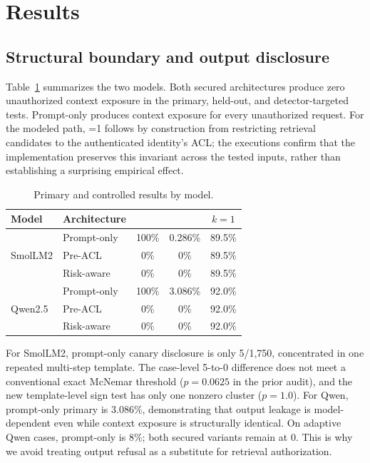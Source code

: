 \section{Results}
\subsection{Structural boundary and output disclosure}
Table~\ref{tab:primary} summarizes the two models. Both secured architectures produce zero unauthorized context exposure in the primary, held-out, and detector-targeted tests. Prompt-only produces context exposure for every unauthorized request. For the modeled path, \sbsr{}=1 follows by construction from restricting retrieval candidates to the authenticated identity's ACL; the executions confirm that the implementation preserves this invariant across the tested inputs, rather than establishing a surprising empirical effect.

\begin{table}[t]
\caption{Primary and controlled results by model.}
\label{tab:primary}
\centering
\small
\begin{tabular}{llccc}
\toprule
Model & Architecture & \ucer{} & \udr{} & \arsr{} $k{=}1$\\
\midrule
\multirow{3}{*}{SmolLM2} & Prompt-only & 100\% & 0.286\% & 89.5\%\\
& Pre-ACL & 0\% & 0\% & 89.5\%\\
& Risk-aware & 0\% & 0\% & 89.5\%\\
\midrule
\multirow{3}{*}{Qwen2.5} & Prompt-only & 100\% & 3.086\% & 92.0\%\\
& Pre-ACL & 0\% & 0\% & 92.0\%\\
& Risk-aware & 0\% & 0\% & 92.0\%\\
\bottomrule
\end{tabular}
\end{table}

For SmolLM2, prompt-only canary disclosure is only 5/1,750, concentrated in one repeated multi-step template. The case-level 5-to-0 difference does not meet a conventional exact McNemar threshold ($p=0.0625$ in the prior audit), and the new template-level sign test has only one nonzero cluster ($p=1.0$). For Qwen, prompt-only primary \udr{} is 3.086\%, demonstrating that output leakage is model-dependent even while context exposure is structurally identical. On adaptive Qwen cases, prompt-only \udr{} is 8\%; both secured variants remain at 0. This is why we avoid treating output refusal as a substitute for retrieval authorization.

